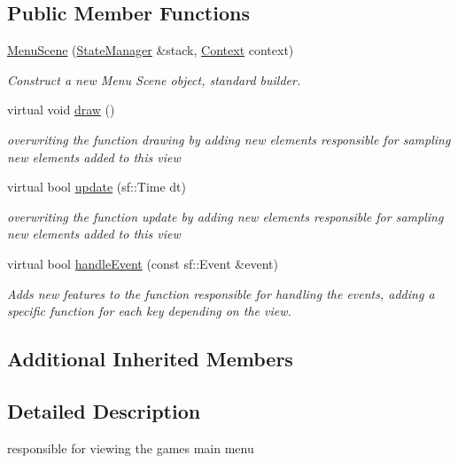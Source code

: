 \subsection*{Public Member Functions}
\begin{DoxyCompactItemize}
\item 
\hyperlink{classMenuScene_ad5964f15d3a3f9daa3ab89c8cb4eb3b6}{Menu\+Scene} (\hyperlink{classStateManager}{State\+Manager} \&stack, \hyperlink{structState_1_1Context}{Context} context)
\begin{DoxyCompactList}\small\item\em Construct a new Menu Scene object, standard builder. \end{DoxyCompactList}\item 
\mbox{\label{classMenuScene_a1950514cb59988544094f4a18feef437}} 
virtual void \hyperlink{classMenuScene_a1950514cb59988544094f4a18feef437}{draw} ()
\begin{DoxyCompactList}\small\item\em overwriting the function drawing by adding new elements responsible for sampling new elements added to this view \end{DoxyCompactList}\item 
virtual bool \hyperlink{classMenuScene_ab18847a026d82d5ffe8c869bbf78725e}{update} (sf\+::\+Time dt)
\begin{DoxyCompactList}\small\item\em overwriting the function update by adding new elements responsible for sampling new elements added to this view \end{DoxyCompactList}\item 
virtual bool \hyperlink{classMenuScene_a47f06ae8b2a4830a0a6d104db52fd624}{handle\+Event} (const sf\+::\+Event \&event)
\begin{DoxyCompactList}\small\item\em Adds new features to the function responsible for handling the events, adding a specific function for each key depending on the view. \end{DoxyCompactList}\end{DoxyCompactItemize}
\subsection*{Additional Inherited Members}


\subsection{Detailed Description}
responsible for viewing the game\textquotesingle{}s main menu 

